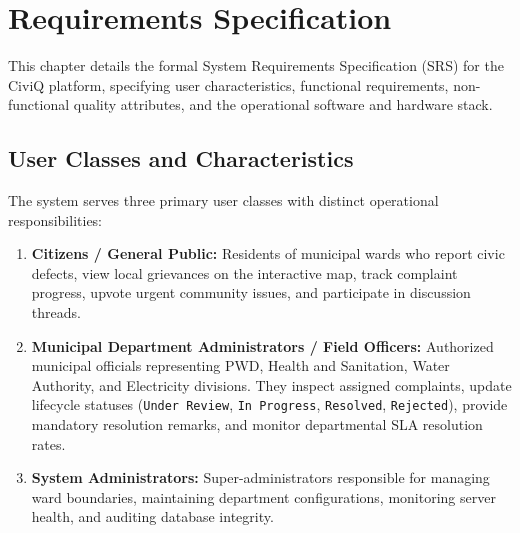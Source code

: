 \documentclass[12pt,a4paper]{report}
\begin{document}
\chapter{Requirements Specification}

This chapter details the formal System Requirements Specification (SRS) for the CiviQ platform, specifying user characteristics, functional requirements, non-functional quality attributes, and the operational software and hardware stack.

\section{User Classes and Characteristics}
The system serves three primary user classes with distinct operational responsibilities:
\begin{enumerate}
    \item \textbf{Citizens / General Public:} Residents of municipal wards who report civic defects, view local grievances on the interactive map, track complaint progress, upvote urgent community issues, and participate in discussion threads.
    \item \textbf{Municipal Department Administrators / Field Officers:} Authorized municipal officials representing PWD, Health and Sanitation, Water Authority, and Electricity divisions. They inspect assigned complaints, update lifecycle statuses (\texttt{Under Review}, \texttt{In Progress}, \texttt{Resolved}, \texttt{Rejected}), provide mandatory resolution remarks, and monitor departmental SLA resolution rates.
    \item \textbf{System Administrators:} Super-administrators responsible for managing ward boundaries, maintaining department configurations, monitoring server health, and auditing database integrity.
\end{enumerate}
\end{document}
